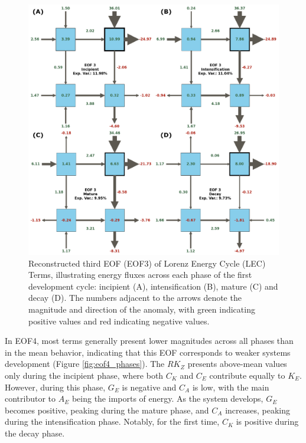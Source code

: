 \begin{figure}[!htbp]
\centering
\includegraphics[width=\textwidth]{figs_5/eof3_phases_reconstructed.pdf}
\caption[Reconstructed EOF3 - Phases]{Reconstructed third EOF (EOF3) of Lorenz Energy Cycle (LEC) Terms, illustrating energy fluxes across each phase of the first development cycle: incipient (A), intensification (B), mature (C) and decay (D).  The numbers adjacent to the arrows denote the magnitude and direction of the anomaly, with green indicating positive values and red indicating negative values.}
\label{fig:eof3_phases}
\end{figure}

In EOF4, most terms generally present lower magnitudes across all phases than in the mean behavior, indicating that this EOF corresponds to weaker systems development (Figure \ref{fig:eof4_phases}). The $RK_Z$ presents above-mean values only during the incipient phase, where both $C_K$ and $C_E$ contribute equally to $K_E$. However, during this phase, $G_E$ is negative and $C_A$ is low, with the main contributor to $A_E$ being the imports of energy. As the system develops, $G_E$ becomes positive, peaking during the mature phase, and $C_A$ increases, peaking during the intensification phase. Notably, for the first time, $C_K$ is positive during the decay phase.

